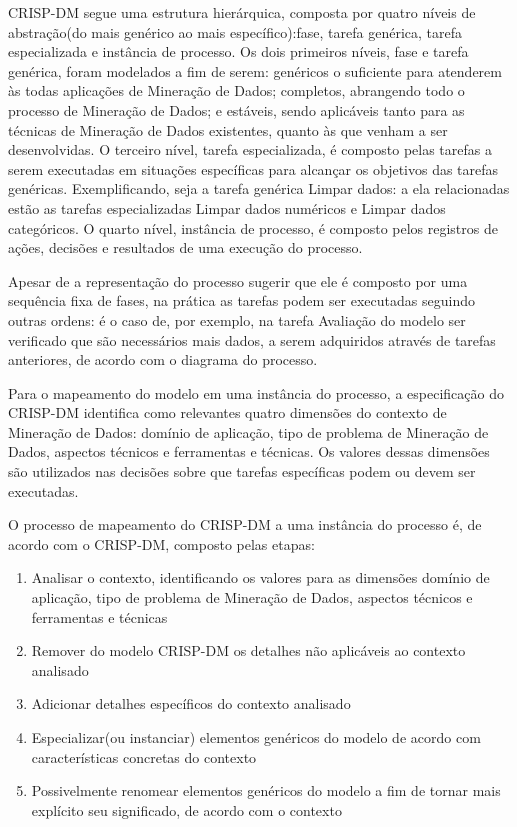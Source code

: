CRISP-DM segue uma estrutura hierárquica, composta por quatro níveis de abstração(do mais genérico ao mais específico):fase, tarefa genérica, tarefa especializada e instância de processo. Os dois primeiros níveis, fase e tarefa genérica, foram modelados a fim de serem: genéricos o suficiente para atenderem às todas aplicações de Mineração de Dados; completos, abrangendo todo o processo de Mineração de Dados; e estáveis, sendo aplicáveis tanto para as técnicas de Mineração de Dados existentes, quanto às que venham a ser desenvolvidas. O terceiro nível, tarefa especializada, é composto pelas tarefas a serem executadas em situações específicas para alcançar os objetivos das tarefas genéricas. Exemplificando, seja a tarefa genérica Limpar dados: a ela relacionadas estão as tarefas especializadas Limpar dados numéricos e Limpar dados categóricos. O quarto nível, instância de processo, é composto pelos registros de ações, decisões e resultados de uma execução do processo\cite{CRISP-DM}.

Apesar de a representação do processo sugerir que ele é composto por uma sequência fixa de fases, na prática as tarefas podem ser executadas seguindo outras ordens: é o caso de, por exemplo, na tarefa Avaliação do modelo ser verificado que são necessários mais dados, a serem adquiridos através de tarefas anteriores, de acordo com o diagrama do processo.

Para o mapeamento do modelo em uma instância do processo, a especificação do CRISP-DM identifica como relevantes quatro dimensões do contexto de Mineração de Dados: domínio de aplicação, tipo de problema de Mineração de Dados, aspectos técnicos e ferramentas e técnicas. Os valores dessas dimensões são utilizados nas decisões sobre que tarefas específicas podem ou devem ser executadas.

O processo de mapeamento do CRISP-DM a uma instância do processo é, de acordo com o CRISP-DM, composto pelas etapas:

\begin{enumerate}

\item Analisar o contexto, identificando os valores para as dimensões domínio de aplicação, tipo de problema de Mineração de Dados, aspectos técnicos e ferramentas e técnicas

\item Remover do modelo CRISP-DM os detalhes não aplicáveis ao contexto analisado

\item Adicionar detalhes específicos do contexto analisado

\item Especializar(ou instanciar) elementos genéricos do modelo de acordo com características concretas do contexto

\item Possivelmente renomear elementos genéricos do modelo a fim de tornar mais explícito seu significado, de acordo com o contexto

\end{enumerate}

